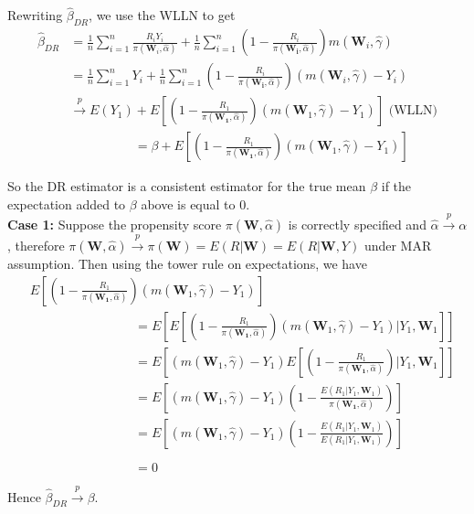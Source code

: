 \documentclass[12pt,twoside]{article}
\begin{document}
Rewriting $\hat{\beta}_{DR}$, we use the WLLN to get
\begin{align*}
    \hat{\beta}_{DR} & = \frac{1}{n}\sum_{i=1}^{n}\frac{R_iY_i}{\pi(\mathbf{W}_i, \hat{\alpha})} + \frac{1}{n}\sum_{i=1}^{n} \left(1 - \frac{R_i}{\pi(\mathbf{W_i},\hat{\alpha})} \right) m(\mathbf{W}_i, \hat\gamma) \\
    & = \frac{1}{n}\sum_{i=1}^{n} Y_i + \frac{1}{n}\sum_{i=1}^{n}\left(1 - \frac{R_i}{\pi(\mathbf{W_i},\hat{\alpha})} \right) (m(\mathbf{W}_i, \hat\gamma)-Y_i) \\
    & \xrightarrow{p} E(Y_1) + E\left[\left(1 - \frac{R_1}{\pi(\mathbf{W_1},\hat{\alpha})} \right) (m(\mathbf{W}_1, \hat\gamma)-Y_1)\right] \text{ (WLLN)} \\
    & \phantom{\xrightarrow{p} E(Y_1)} = \beta + E\left[\left(1 - \frac{R_1}{\pi(\mathbf{W_1},\hat{\alpha})} \right) (m(\mathbf{W}_1, \hat\gamma)-Y_1)\right]
\end{align*}

So the DR estimator is a consistent estimator for the true mean $\beta$ if the expectation added to $\beta$ above is equal to 0. \\

\textbf{Case 1:} Suppose the propensity score $\pi(\mathbf{W},\hat{\alpha})$ is correctly specified and $\hat{\alpha} \xrightarrow{p} \alpha$, therefore  $\pi(\mathbf{W},\hat{\alpha}) \xrightarrow{p} \pi(\mathbf{W}) = E(R|\mathbf{W}) = E(R|\mathbf{W}, Y)$ under MAR assumption. Then using the tower rule on expectations, we have
\begin{align*}
     & E \left[\left(1 - \frac{R_1}{\pi(\mathbf{W_1},\hat{\alpha})} \right) (m(\mathbf{W}_1, \hat\gamma)-Y_1)\right]  \\
     & \phantom{E [(1 - \frac{R_1}{\pi(\mathbf{W_1},\hat{\alpha})})} = E\left[E\left[\left(1 - \frac{R_1}{\pi(\mathbf{W_1},\hat{\alpha})} \right) (m(\mathbf{W}_1, \hat\gamma)-Y_1)|Y_1, \mathbf{W}_1\right]\right] \\
     & \phantom{E [(1 - \frac{R_1}{\pi(\mathbf{W_1},\hat{\alpha})})} = E\left[ (m(\mathbf{W}_1, \hat\gamma)-Y_1)E\left[\left(1 - \frac{R_1}{\pi(\mathbf{W_1},\hat{\alpha})} \right)|Y_1, \mathbf{W}_1\right]\right] \\
     & \phantom{E [(1 - \frac{R_1}{\pi(\mathbf{W_1},\hat{\alpha})})} = E\left[ (m(\mathbf{W}_1, \hat\gamma)-Y_1)\left(1 - \frac{E(R_1|Y_1, \mathbf{W}_1)}{\pi(\mathbf{W_1},\hat{\alpha})} \right)\right] \\
     & \phantom{E [(1 - \frac{R_1}{\pi(\mathbf{W_1},\hat{\alpha})})} = E\left[ (m(\mathbf{W}_1, \hat\gamma)-Y_1)\left(1 - \frac{E(R_1|Y_1, \mathbf{W}_1)}{E(R_1|Y_1, \mathbf{W}_1)} \right)\right] \\
     & \phantom{E [(1 - \frac{R_1}{\pi(\mathbf{W_1},\hat{\alpha})})} = 0
\end{align*}
Hence $\hat{\beta}_{DR} \xrightarrow{p} \beta$. \\
\end{document}

